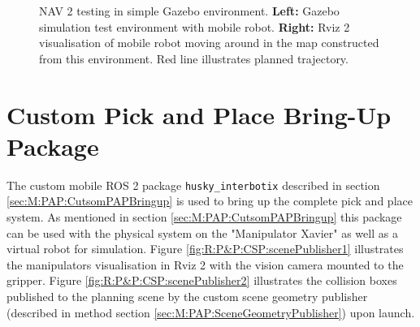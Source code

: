 \begin{figure}[htp!]
\begin{minipage}[b]{0.49\textwidth}
  \end{minipage}
  \caption{NAV 2 testing in simple Gazebo environment. \textbf{Left:} Gazebo simulation test environment with mobile robot. \textbf{Right:} Rviz 2 visualisation of mobile robot moving around in the map constructed from this environment. Red line illustrates planned trajectory.}
  \label{fig:R:H:NAV:figNav2Sim}
\end{figure}





\FloatBarrier
\section{Custom Pick and Place Bring-Up Package}
 The custom mobile ROS 2 package \lstinline{husky_interbotix} described in section \ref{sec:M:PAP:CutsomPAPBringup} is used to bring up the complete pick and place system. As mentioned in section \ref{sec:M:PAP:CutsomPAPBringup} this package can be used with the physical system on the "Manipulator Xavier" as well as a virtual robot for simulation. Figure \ref{fig:R:P&P:CSP:scenePublisher1} illustrates the manipulators visualisation in Rviz 2 with the vision camera mounted to the gripper. Figure \ref{fig:R:P&P:CSP:scenePublisher2} illustrates the collision boxes published to the planning scene by the custom scene geometry publisher (described in method section \ref{sec:M:PAP:SceneGeometryPublisher}) upon launch.

